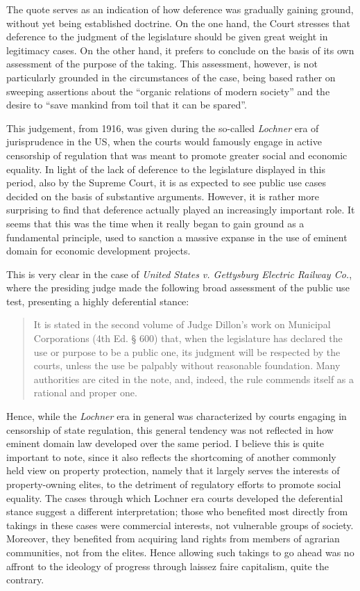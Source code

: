 The quote serves as an indication of how deference was gradually gaining ground, without yet being established doctrine. On the one hand, the Court stresses that deference to the judgment of the legislature should be given great weight in legitimacy cases. On the other hand, it prefers to conclude on the basis of its own assessment of the purpose of the taking. This assessment, however, is not particularly grounded in the circumstances of the case, being based rather on sweeping assertions about the ``organic relations of modern society'' and the desire to ``save mankind from toil that it can be spared''. 

This judgement, from 1916, was given during the so-called {\it Lochner} era of jurisprudence in the US, when the courts would famously engage in active censorship of regulation that was meant to promote greater social and economic equality.  In light of the lack of deference to the legislature displayed in this period, also by the Supreme Court, it is as expected to see public use cases decided on the basis of substantive arguments. However, it is rather more surprising to find that deference actually played an increasingly important role. It seems that this was the time when it really began to gain ground as a fundamental principle, used to sanction a massive expanse in the use of eminent domain for economic development projects.

This is very clear in the case of { \it United States v. Gettysburg Electric Railway Co.}, where the presiding judge made the following broad assessment of the public use test, presenting a highly deferential stance: 

\begin{quote}
It is stated in the second volume of Judge Dillon's work on Municipal Corporations (4th Ed. § 600) that, when the legislature has declared the use or purpose to be a public one, its judgment will be respected by the courts, unless the use be palpably without reasonable foundation. Many authorities are cited in the note, and, indeed, the rule commends itself as a rational and proper one.
\end{quote}

Hence, while the {\it Lochner} era in general was characterized by courts engaging in censorship of state regulation, this general tendency was not reflected in how eminent domain law developed over the same period. I believe this is quite important to note, since it also reflects the shortcoming of another commonly held view on property protection, namely that it largely serves the interests of property-owning elites, to the detriment of regulatory efforts to promote social equality. The cases through which Lochner era courts developed the deferential stance suggest a different interpretation; those who benefited most directly from takings in these cases were commercial interests, not vulnerable groups of society. Moreover, they benefited from acquiring land rights from members of agrarian communities, not from the elites. Hence allowing such takings to go ahead was no affront to the ideology of progress through laissez faire capitalism, quite the contrary.

